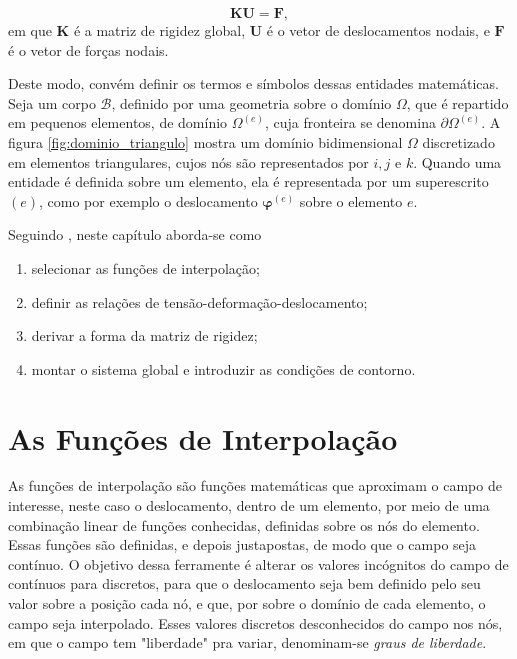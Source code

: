 \begin{equation}
    \bm{K} \bm{U} = \bm{F},
    \label{eq:sistema_global}
\end{equation}
em que $\bm{K}$ é a matriz de rigidez global, $\bm{U}$ é o vetor de deslocamentos nodais, e $\bm{F}$ é o vetor de forças nodais.

Deste modo, convém definir os termos e símbolos dessas entidades matemáticas. Seja um corpo $\mathcal{B}$, definido por uma geometria sobre o domínio $\Omega$, que é repartido em pequenos elementos, de domínio $\Omega^{(e)}$, cuja fronteira se denomina $\partial\Omega^{(e)}$. A figura \ref{fig:dominio_triangulo} mostra um domínio bidimensional $\Omega$ discretizado em elementos triangulares, cujos nós são representados por $i, j$ e $k$. Quando uma entidade é definida sobre um elemento, ela é representada por um superescrito $(e)$, como por exemplo o deslocamento $\bm{\varphi}^{(e)}$ sobre o elemento $e$.

Seguindo , neste capítulo aborda-se como
\begin{enumerate}
    \item selecionar as funções de interpolação;
    \item definir as relações de tensão-deformação-deslocamento;
    \item derivar a forma da matriz de rigidez;
    \item montar o sistema global e introduzir as condições de contorno.
\end{enumerate}



\section{As Funções de Interpolação}

As funções de interpolação são funções matemáticas que aproximam o campo de interesse, neste caso o deslocamento, dentro de um elemento, por meio de uma combinação linear de funções conhecidas, definidas sobre os nós do elemento. Essas funções são definidas, e depois justapostas, de modo que o campo seja contínuo. O objetivo dessa ferramente é alterar os valores incógnitos do campo de contínuos para discretos, para que o deslocamento seja bem definido pelo seu valor sobre a posição cada nó, e que, por sobre o domínio de cada elemento, o campo seja interpolado. Esses valores discretos desconhecidos do campo nos nós, em que o campo tem "liberdade" pra variar, denominam-se \emph{graus de liberdade}. \cite{LOGAN}

